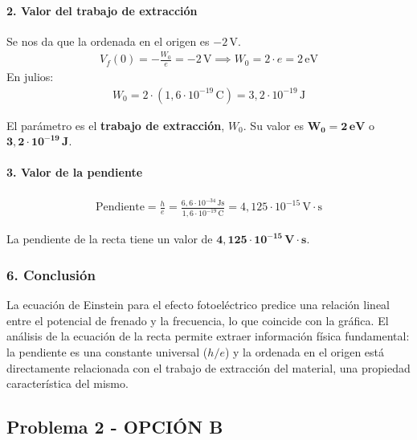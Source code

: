 \paragraph{2. Valor del trabajo de extracción}
Se nos da que la ordenada en el origen es $-2\,\text{V}$.
\begin{gather}
    V_f(0) = -\frac{W_0}{e} = -2\,\text{V} \implies W_0 = 2 \cdot e = 2\,\text{eV}
\end{gather}
En julios:
\begin{gather}
    W_0 = 2 \cdot (1,6\cdot10^{-19}\,\text{C}) = 3,2\cdot10^{-19}\,\text{J}
\end{gather}
\begin{cajaresultado}
El parámetro es el \textbf{trabajo de extracción}, $W_0$. Su valor es $\boldsymbol{W_0 = 2\,\textbf{eV}}$ o $\boldsymbol{3,2\cdot10^{-19}\,\textbf{J}}$.
\end{cajaresultado}

\paragraph{3. Valor de la pendiente}
\begin{gather}
    \text{Pendiente} = \frac{h}{e} = \frac{6,6\cdot10^{-34}\,\text{Js}}{1,6\cdot10^{-19}\,\text{C}} = 4,125\cdot10^{-15}\,\text{V}\cdot\text{s}
\end{gather}
\begin{cajaresultado}
La pendiente de la recta tiene un valor de $\boldsymbol{4,125\cdot10^{-15}\,\textbf{V}\cdot\textbf{s}}$.
\end{cajaresultado}

\subsubsection*{6. Conclusión}
\begin{cajaconclusion}
La ecuación de Einstein para el efecto fotoeléctrico predice una relación lineal entre el potencial de frenado y la frecuencia, lo que coincide con la gráfica. El análisis de la ecuación de la recta permite extraer información física fundamental: la pendiente es una constante universal ($h/e$) y la ordenada en el origen está directamente relacionada con el trabajo de extracción del material, una propiedad característica del mismo.
\end{cajaconclusion}

\newpage

\subsection{Problema 2 - OPCIÓN B}
\label{subsec:5B_2006_jun_ord}

